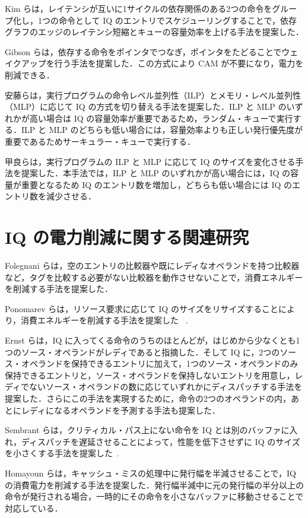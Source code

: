 Kim らは，レイテンシが互いに1サイクルの依存関係のある2つの命令をグループ化し，1つの命令として IQ のエントリでスケジューリングすることで，依存グラフのエッジのレイテンシ短縮とキューの容量効率を上げる手法を提案した\cite{Kim2003}．

Gibson らは，依存する命令をポインタでつなぎ，ポインタをたどることでウェイクアップを行う手法を提案した\cite{Gibson2010}．この方式により CAM が不要になり，電力を削減できる．

安藤らは，実行プログラムの命令レベル並列性（ILP）とメモリ・レベル並列性（MLP）に応じて IQ の方式を切り替える手法を提案した\cite{Ando2019}．ILP と MLP のいずれかが高い場合は IQ の容量効率が重要であるため，ランダム・キューで実行する．ILP と MLP のどちらも低い場合には，容量効率よりも正しい発行優先度が重要であるためサーキュラー・キューで実行する．

甲良らは，実行プログラムの ILP と MLP に応じて IQ のサイズを変化させる手法を提案した\cite{Kora2013}．本手法では，ILP と MLP のいずれかが高い場合には，IQ の容量が重要となるため IQ のエントリ数を増加し，どちらも低い場合には IQ のエントリ数を減少させる．

\section{IQ の電力削減に関する関連研究}
\label{sec:relate_energy}
Folegnani らは，空のエントリの比較器や既にレディなオペランドを持つ比較器など，タグを比較する必要がない比較器を動作させないことで，消費エネルギーを削減する手法を提案した\cite{folegnani2001}．

Ponomarev らは，リソース要求に応じて IQ のサイズをリサイズすることにより，消費エネルギーを削減する手法を提案した~\cite{ponomarev2001} .

Ernst らは，IQ に入ってくる命令のうちのほとんどが，はじめから少なくとも1つのソース・オペランドがレディであると指摘した\cite{ernst2002}．そして IQ に，2つのソース・オペランドを保持できるエントリに加えて，1つのソース・オペランドのみ保持できるエントリと，ソース・オペランドを保持しないエントリを用意し，レディでないソース・オペランドの数に応じていずれかにディスパッチする手法を提案した．さらにこの手法を実現するために，命令の2つのオペランドの内，あとにレディになるオペランドを予測する手法も提案した．

Sembrant らは，クリティカル・パス上にない命令を IQ とは別のバッファに入れ，ディスパッチを遅延させることによって，性能を低下させずに IQ のサイズを小さくする手法を提案した~\cite{Sembrant2015}.

Homayoun らは，キャッシュ・ミスの処理中に発行幅を半減させることで，IQ の消費電力を削減する手法を提案した\cite{H.Homayoun2011}．発行幅半減中に元の発行幅の半分以上の命令が発行される場合，一時的にその命令を小さなバッファに移動させることで対応している．

